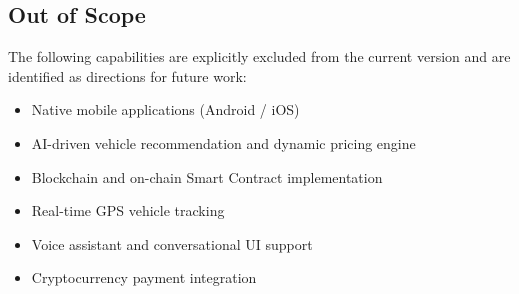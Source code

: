 \subsection{Out of Scope}

The following capabilities are explicitly excluded from the current version and are identified as directions for future work:

\begin{itemize}
    \item Native mobile applications (Android / iOS)
    \item AI-driven vehicle recommendation and dynamic pricing engine
    \item Blockchain and on-chain Smart Contract implementation
    \item Real-time GPS vehicle tracking
    \item Voice assistant and conversational UI support
    \item Cryptocurrency payment integration
\end{itemize}

